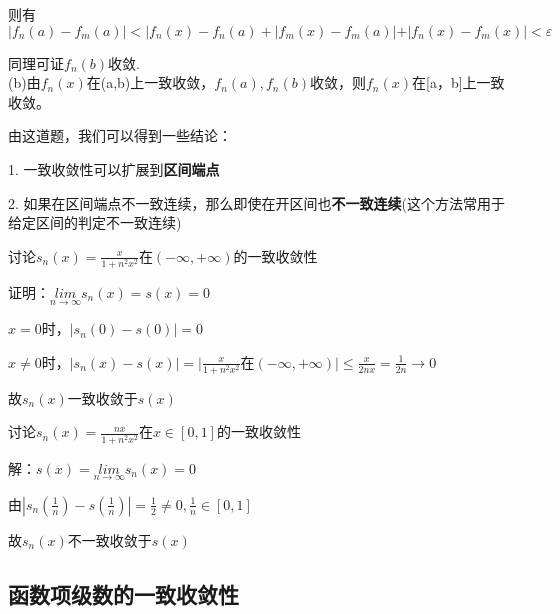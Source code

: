 \documentclass[lang=cn,10pt]{elegantbook}
\begin{document}
则有
\begin{equation*}
	|f_{n}(a)-f_{m}(a)|	<|f_{n}(x)-f_{n}(a)+|f_{m}(x)-f_{m}(a)|+|f_{n}(x)-f_{m}(x)|<\varepsilon
\end{equation*}

同理可证${f_{n}(b)}$收敛.~\\

(b)由$f_{n}(x)$在(a,b)上一致收敛，${f_{n}(a)},{f_{n}(b)}$收敛，则$f_{n}(x)$在[a，b]上一致收敛。

由这道题，我们可以得到一些结论：
\begin{conclusion}
	1. 一致收敛性可以扩展到\textbf{区间端点} 
	
	2. 如果在区间端点不一致连续，那么即使在开区间也\textbf{不一致连续}(这个方法常用于给定区间的判定不一致连续)
\end{conclusion}

\begin{example}

讨论$s_{n}(x)=\frac{x}{1+n^{2}x^{2}}$在$(-\infty ,+\infty )$的一致收敛性
\end{example}

证明：$\underset{n\to \infty}{lim}s_{n}(x)=s(x)=0$

$x=0$时，$|s_{n}(0)-s(0)|=0$

$x\ne 0$时，$|s_{n}(x)-s(x)|=|\frac{x}{1+n^{2}x^{2}}$在$(-\infty ,+\infty )|\le \frac{x}{2nx}=\frac{1}{2n} \longrightarrow 0$

故$s_{n}(x)$一致收敛于$s(x)$

\begin{example}
	讨论$s_{n}(x)=\frac{nx}{1+n^{2}x^{2}}$在$x\in [0,1]$的一致收敛性
\end{example}

解：$s(x)=\underset{n\to \infty}{lim}s_{n}(x)=0$

由$|s_{n}(\frac{1}{n})-s(\frac{1}{n})|=\frac{1}{2} \ne 0,\frac{1}{n} \in [0,1]$

故$s_{n}(x)$不一致收敛于$s(x)$
\subsection{函数项级数的一致收敛性}
\end{document}
